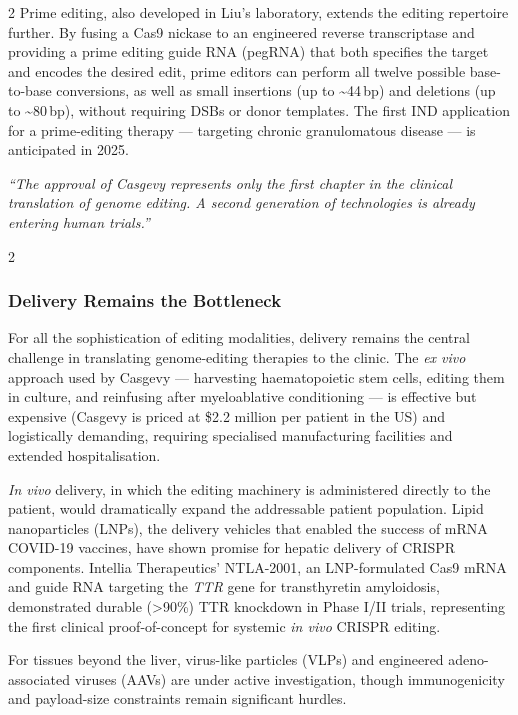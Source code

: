 \documentclass[a4paper,11pt]{article}
\newcommand{\pullquote}[2][2]{%
  \end{multicols}
  \vspace{8pt}
  \begin{tcolorbox}[
    enhanced,
    colback=boxbg,
    colframe=accent,
    arc=0mm,
    boxrule=0pt,
    leftrule=4pt,
    top=10pt,
    bottom=10pt,
    left=14pt,
    right=14pt,
    before skip=0pt,
    after skip=0pt,
  ]
  {\large\itshape\color{accent}``#2''}
  \end{tcolorbox}
  \vspace{8pt}
  \begin{multicols}{#1}
  \noindent\ignorespaces
}
\begin{document}
\begin{multicols}{2}
\medskip
Prime editing, also developed in Liu's laboratory, extends the editing
repertoire further. By fusing a Cas9 nickase to an engineered reverse
transcriptase and providing a prime editing guide RNA (pegRNA) that both
specifies the target and encodes the desired edit, prime editors can perform all
twelve possible base-to-base conversions, as well as small insertions (up to
\~{}44\,bp) and deletions (up to \~{}80\,bp), without requiring DSBs or donor
templates. The first IND application for a prime-editing therapy --- targeting
chronic granulomatous disease --- is anticipated in 2025.

\pullquote{The approval of Casgevy represents only the first chapter in the
clinical translation of genome editing. A second generation of technologies
is already entering human trials.}

\subsubsection{Delivery Remains the Bottleneck}

For all the sophistication of editing modalities, delivery remains the central
challenge in translating genome-editing therapies to the clinic. The \textit{ex
vivo} approach used by Casgevy --- harvesting haematopoietic stem cells,
editing them in culture, and reinfusing after myeloablative conditioning --- is
effective but expensive (Casgevy is priced at \$2.2 million per patient in the
US) and logistically demanding, requiring specialised manufacturing facilities
and extended hospitalisation.

\medskip
\textit{In vivo} delivery, in which the editing machinery is administered
directly to the patient, would dramatically expand the addressable patient
population. Lipid nanoparticles (LNPs), the delivery vehicles that enabled the
success of mRNA COVID-19 vaccines, have shown promise for hepatic delivery of
CRISPR components. Intellia Therapeutics' NTLA-2001, an LNP-formulated
Cas9 mRNA and guide RNA targeting the \textit{TTR} gene for transthyretin
amyloidosis, demonstrated durable (\textgreater 90\%) TTR knockdown in Phase
I/II trials, representing the first clinical proof-of-concept for systemic
\textit{in vivo} CRISPR editing.

\medskip
For tissues beyond the liver, virus-like particles (VLPs) and engineered
adeno-associated viruses (AAVs) are under active investigation, though
immunogenicity and payload-size constraints remain significant hurdles.


\end{multicols}
\end{document}
